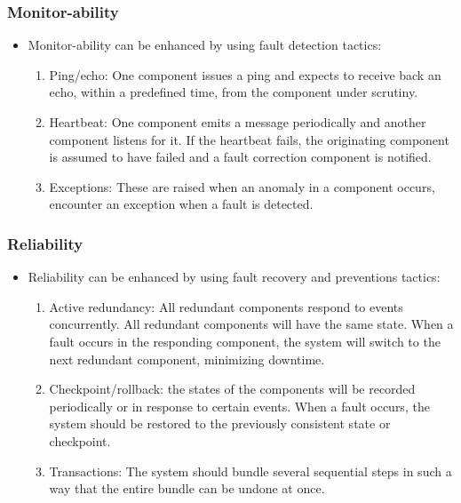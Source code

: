 \subsubsection{Monitor-ability}
	\begin{itemize}
		\item Monitor-ability can be enhanced by using fault detection tactics:
		\begin{enumerate}
			\item Ping/echo: One component issues a ping and expects to receive back an echo, within a predefined time, from the component under scrutiny.
			\item Heartbeat: One component emits a message periodically and another component listens for it. If the heartbeat fails, the originating component is assumed to have failed and a fault correction component is notified.
			\item Exceptions: These are raised when an anomaly in a component occurs, encounter an exception when a fault is detected.
		\end{enumerate}
	\end{itemize}
\subsubsection{Reliability}
	\begin{itemize}
		\item Reliability can be enhanced by using fault recovery and preventions tactics:
		\begin{enumerate}
			\item Active redundancy: All redundant components respond to events concurrently. All redundant components will have the same state. When a fault occurs in the responding component, the system will switch to the next redundant component, minimizing downtime.
			\item Checkpoint/rollback: the states of the components will be recorded periodically or in response to certain events. When a fault occurs, the system should be restored to the previously consistent state or checkpoint.
			\item Transactions: The system should bundle several sequential steps in such a way that the entire bundle can be undone at once. 
		\end{enumerate}
	\end{itemize}
